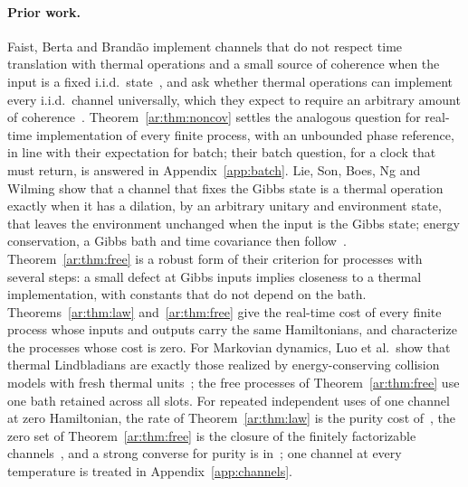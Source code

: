 \paragraph{Prior work.} Faist, Berta and Brand\~ao implement channels that do not respect time translation with thermal operations and a small source of coherence when the input is a fixed i.i.d.\ state~\cite[Sec.~8.2]{FBB21}, and ask whether thermal operations can implement every i.i.d.\ channel universally, which they expect to require an arbitrary amount of coherence~\cite[Sec.~9]{FBB21}. Theorem~\ref{ar:thm:noncov} settles the analogous question for real-time implementation of every finite process, with an unbounded phase reference, in line with their expectation for batch; their batch question, for a clock that must return, is answered in Appendix~\ref{app:batch}. Lie, Son, Boes, Ng and Wilming show that a channel that fixes the Gibbs state is a thermal operation exactly when it has a dilation, by an arbitrary unitary and environment state, that leaves the environment unchanged when the input is the Gibbs state; energy conservation, a Gibbs bath and time covariance then follow~\cite[Def.~1, Lemma~3, Prop.~4]{LieEtAl26}. Theorem~\ref{ar:thm:free} is a robust form of their criterion for processes with several steps: a small defect at Gibbs inputs implies closeness to a thermal implementation, with constants that do not depend on the bath. Theorems~\ref{ar:thm:law} and~\ref{ar:thm:free} give the real-time cost of every finite process whose inputs and outputs carry the same Hamiltonians, and characterize the processes whose cost is zero. For Markovian dynamics, Luo et al.\ show that thermal Lindbladians are exactly those realized by energy-conserving collision models with fresh thermal units~\cite{LuoTrinity26}; the free processes of Theorem~\ref{ar:thm:free} use one bath retained across all slots. For repeated independent uses of one channel at zero Hamiltonian, the rate of Theorem~\ref{ar:thm:law} is the purity cost of~\cite{Douglas26closed}, the zero set of Theorem~\ref{ar:thm:free} is the closure of the finitely factorizable channels~\cite{Memory}, and a strong converse for purity is in~\cite{Flagship}; one channel at every temperature is treated in Appendix~\ref{app:channels}.

